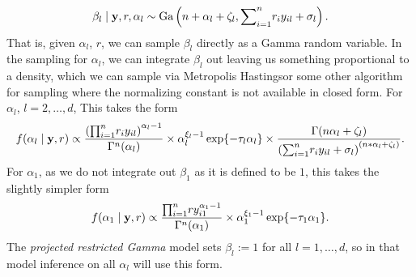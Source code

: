   \begin{equation}
    \label{eqn:betafc}
    \beta_l\mid {\bf y}, r, \alpha_l \sim \text{Ga}\left(n + \alpha_l + \zeta_l,
                                      {\small \sum}_{i = 1}^nr_iy_{il} + \sigma_l\right).
  \end{equation}
  That is, given $\alpha_l$, $r$, we can sample $\beta_l$ directly as a Gamma random variable.  In
  the sampling for $\alpha_l$, we can integrate $\beta_l$ out leaving us something proportional
  to a density, which we can sample via Metropolis Hastings\findcite or some other algorithm for
  sampling where the normalizing constant is not available in closed form.  For $\alpha_l$,
  $l = 2,\ldots, d$, This takes the form
  \begin{equation}
    \label{eqn:alphafc}
    f(\alpha_l \mid {\bf y}, r) \propto
    \frac{\left({\small \prod}_{i = 1}^nr_iy_{il}\right)^{\alpha_l - 1}}{\Gamma^n(\alpha_l)} \times
    \alpha_l^{\xi_l - 1}\exp\{-\tau_l\alpha_l\} \times
    \frac{\Gamma(n\alpha_l + \zeta_l)}{
        \left({\small\sum}_{i = 1}^n r_iy_{il} + \sigma_l\right)^{(n * \alpha_l + \zeta_l)}}.
  \end{equation}
  For $\alpha_1$, as we do not integrate out $\beta_1$ as it is defined to be $1$, this takes the
  slightly simpler form
  \begin{equation}
    \label{eqn:alphafc1}
    f(\alpha_1 \mid {\bf y}, r) \propto
      \frac{{\small\prod}_{i = 1}^n ry_{i1}^{\alpha_1 - 1}}{\Gamma^n(\alpha_1)} \times
      \alpha_1^{\xi_1 - 1}\exp\{-\tau_1\alpha_1\}.
  \end{equation}
  The \emph{projected restricted Gamma} model sets $\beta_l := 1$ for all $l = 1,\ldots,d$, so in that
  model inference on all $\alpha_l$ will use this form.

